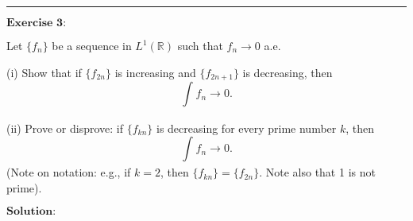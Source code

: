 \documentclass[12pt,a4paper]{ctexart}
\begin{document}
\noindent\rule[0.25\baselineskip]{\textwidth}{0.5pt}

\vspace{8pt}

$\textbf{Exercise 3:}$

Let $\{f_{n}\}$ be a sequence in $L^{1}(\mathbb{R})$ such that $f_{n} \to 0$ a.e.

(i) Show that if $\{f_{2n}\}$ is increasing and $\{f_{2n + 1} \}$ is decreasing, then
\begin{equation*}
    \int_{}^{} f_{n} \to 0.
\end{equation*}

(ii) Prove or disprove: if $\{f_{kn} \}$ is decreasing for every prime number $k$, then 
\begin{equation*}
    \int_{}^{} f_{n} \to 0.
\end{equation*}
(Note on notation: e.g., if $k = 2$, then $\{f_{kn}\} = \{f_{2n}\}$. Note also that 1 is not prime).

\vspace{8pt}
$\textbf{Solution:}$
\end{document}
